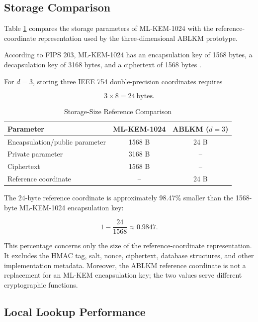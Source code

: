 \documentclass[journal,twocolumn]{IEEEtran}
\begin{document}
\subsection{Storage Comparison}

Table \ref{tab:comparison} compares the storage parameters of ML-KEM-1024 with the reference-coordinate representation used by the three-dimensional ABLKM prototype.

According to FIPS 203, ML-KEM-1024 has an encapsulation key of 1568 bytes, a decapsulation key of 3168 bytes, and a ciphertext of 1568 bytes \cite{nist2024}.

For $d=3$, storing three IEEE 754 double-precision coordinates requires

\begin{equation}
3\times8=24\ \mathrm{bytes}.
\end{equation}

\begin{table}[htbp]
\caption{Storage-Size Reference Comparison}
\label{tab:comparison}
\centering
\begin{tabular}{lcc}
\toprule
\textbf{Parameter} & \textbf{ML-KEM-1024} & \textbf{ABLKM ($d=3$)} \\
\midrule
Encapsulation/public parameter & 1568 B & 24 B \\
Private parameter & 3168 B & -- \\
Ciphertext & 1568 B & -- \\
Reference coordinate & -- & 24 B \\
\bottomrule
\end{tabular}
\end{table}

The 24-byte reference coordinate is approximately 98.47\% smaller than the 1568-byte ML-KEM-1024 encapsulation key:

\begin{equation}
1-\frac{24}{1568}
\approx0.9847.
\end{equation}

This percentage concerns only the size of the reference-coordinate representation. It excludes the HMAC tag, salt, nonce, ciphertext, database structures, and other implementation metadata. Moreover, the ABLKM reference coordinate is not a replacement for an ML-KEM encapsulation key; the two values serve different cryptographic functions.

\subsection{Local Lookup Performance}
\end{document}
